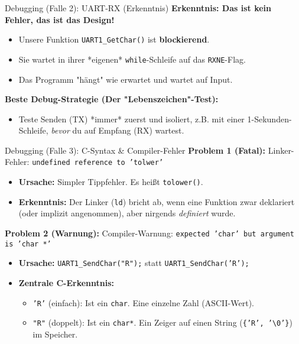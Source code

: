\documentclass{beamer}
\begin{document}
\begin{frame}{Debugging (Falle 2): UART-RX (Erkenntnis)}
	\textbf{Erkenntnis: Das ist kein Fehler, das ist das Design!}
	\begin{itemize}
		\item Unsere Funktion \texttt{UART1\_GetChar()} ist \textbf{blockierend}.
		\item Sie wartet in ihrer *eigenen* \texttt{while}-Schleife auf das \texttt{RXNE}-Flag.
		\item Das Programm "hängt" wie erwartet und wartet auf Input.
	\end{itemize}
	
	\medskip
	\textbf{Beste Debug-Strategie (Der "Lebenszeichen"-Test):}
	\begin{itemize}
		\item Teste Senden (TX) *immer* zuerst und isoliert, z.B. mit einer 1-Sekunden-Schleife, \textit{bevor} du auf Empfang (RX) wartest.
	\end{itemize}
\end{frame}


\begin{frame}[fragile]{Debugging (Falle 3): C-Syntax \& Compiler-Fehler}
	\textbf{Problem 1 (Fatal):} Linker-Fehler: \texttt{undefined reference to 'tolwer'}
	\begin{itemize}
		\item \textbf{Ursache:} Simpler Tippfehler. Es heißt \texttt{tolower()}.
		\item \textbf{Erkenntnis:} Der Linker (\texttt{ld}) bricht ab, wenn eine Funktion zwar deklariert (oder implizit angenommen), aber nirgends \textit{definiert} wurde.
	\end{itemize}
	
	\bigskip
	\textbf{Problem 2 (Warnung):} Compiler-Warnung: \texttt{expected 'char' but argument is 'char *'}
	\begin{itemize}
		\item \textbf{Ursache:} \texttt{UART1\_SendChar("R");} statt \texttt{UART1\_SendChar('R');}
		\item \textbf{Zentrale C-Erkenntnis:}
		\begin{itemize}
			\item \texttt{'R'} (einfach): Ist ein \texttt{char}. Eine einzelne Zahl (ASCII-Wert).
			\item \texttt{"R"} (doppelt): Ist ein \texttt{char*}. Ein Zeiger auf einen String (\texttt{\{'R', '\textbackslash{}0'\}}) im Speicher.
		\end{itemize}
	\end{itemize}
\end{frame}
\end{document}
